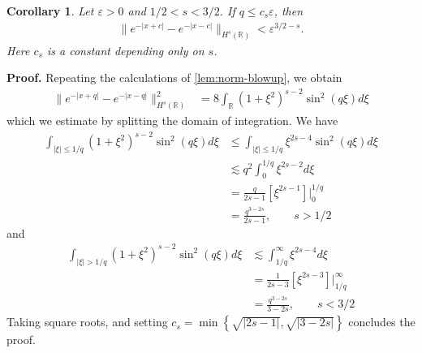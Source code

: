 \documentclass[12pt,reqno]{amsart}
\numberwithin{equation}{section}  %
\numberwithin{figure}{section}
\newcommand{\rr}{\mathbb{R}}
\newcommand{\ee}{\varepsilon}
\theoremstyle{plain}  %
\newtheorem{corollary}{Corollary}
\theoremstyle{definition}
\begin{document}
%
%
%
%
%
%
\begin{corollary}
  \label{cor:peakon-antipeakon-Hs-bound}
  Let $ \ee >0$ and $ 1/2< s < 3/2$. If $q \le c_s \ee$, then 
  \begin{equation}
    \label{peakon-antipeakon-Hs-bound}
    \begin{split}
      \|e^{-| x+ c |} - e^{-| x- c |} \|_{H^{s}(\rr)} < \ee^{3/2 - s}.
    \end{split}
  \end{equation}
  Here $c_s$ is a constant depending only on $s$. 
\end{corollary}
%
%
%
{\bf Proof.}
Repeating the calculations of \autoref{lem:norm-blowup}, we obtain %
%
\begin{equation*}
  \begin{split}
    \|e^{-| x+q |} - e^{-| x-q |} \|^2_{H^s(\rr)}
    & = 8 \int_{\rr} \left( 1 + \xi^2 \right)^{s-2} \sin^2(q \xi) d \xi
  \end{split}
\end{equation*}
%
%
which we estimate by splitting the domain of integration. We have
%
%
%
\begin{equation*}
  \begin{split}
    \int_{| \xi| \le 1/q } (1 + \xi^2)^{s-2} \sin^2(q \xi)d \xi
    & \le \int _{| \xi| \le 1/q }\xi^{2s-4} \sin^2(q \xi)d \xi
    \\
    & \lesssim q^{2} \int_{0}^{1/q} \xi^{2s-2} d \xi
    \\
    & = \frac{q}{2s-1} \left[ \xi^{2s-1} \right] \Big |_0^{1/q}
    \\
    & = \frac{q^{3-2s}}{2s-1}, \qquad s > 1/2
  \end{split}
\end{equation*}
%
%
and
%
%
\begin{equation*}
  \begin{split}
    \int_{| \xi | > 1/q }(1 + \xi^2)^{s-2} \sin^2(q \xi) d \xi
    & \lesssim \int_{1/q}^{\infty} \xi^{2s-4} d \xi
    \\
    & = \frac{1}{2s-3} \left[ \xi^{2s-3} \right] \Big |_{1/q}^{\infty}
    \\
    & = \frac{q^{3-2s}}{3-2s}, \qquad s < 3/2
  \end{split}
\end{equation*}
%
%
Taking square roots, and setting $c_s = \min \left\{ \sqrt{|2s-1|},
\sqrt{|3-2s|} \right\}$ concludes the proof.
\qquad \qedsymbol
\\
\end{document}
